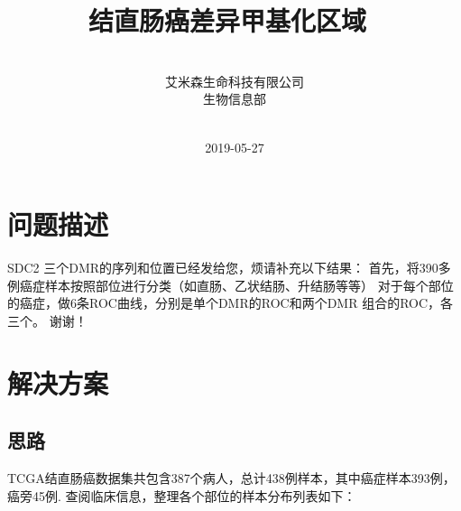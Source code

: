 \documentclass[openany]{book}
\title{结直肠癌差异甲基化区域~}
\author{~ \\ 艾米森生命科技有限公司 \\ 生物信息部 \\ ~}
\date{2019-05-27}
\begin{document}
\maketitle

{
\setcounter{tocdepth}{1}
\tableofcontents
}
\chapter{问题描述}

SDC2 三个DMR的序列和位置已经发给您，烦请补充以下结果：
首先，将390多例癌症样本按照部位进行分类（如直肠、乙状结肠、升结肠等等）
对于每个部位的癌症，做6条ROC曲线，分别是单个DMR的ROC和两个DMR
组合的ROC，各三个。 谢谢！

\chapter{解决方案}

\section{思路}

TCGA结直肠癌数据集共包含387个病人，总计438例样本，其中癌症样本393例，癌旁45例.
查阅临床信息，整理各个部位的样本分布列表如下：
\end{document}
